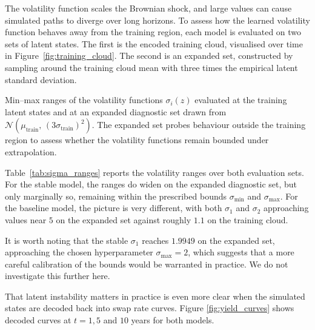 \begin{description}[
    style=unboxed,
    leftmargin=0pt,
    labelindent=0pt,
    labelsep=0.5em
]
\item[Volatility bounds.] The volatility function scales the Brownian shock, and large values can cause simulated paths to diverge over long horizons. To assess how the learned volatility function behaves away from the training region, each model is evaluated on two sets of latent states. The first is the encoded training cloud, visualised over time in Figure~\ref{fig:training_cloud}. The second is an expanded set, constructed by sampling around the training cloud mean with three times the empirical latent standard deviation.

\begin{table}[H]
\centering
\small


\caption{Min--max ranges of the volatility functions $\sigma_i(z)$ evaluated at the training latent states and at an expanded diagnostic set drawn from $\mathcal{N}(\mu_{\mathrm{train}},\, (3\sigma_{\mathrm{train}})^2)$. The expanded set probes behaviour outside the training region to assess whether the volatility functions remain bounded under extrapolation.}
\label{tab:sigma_ranges}
\end{table}

Table~\ref{tab:sigma_ranges} reports the volatility ranges over both evaluation sets. For the stable model, the ranges do widen on the expanded diagnostic set, but only marginally so, remaining within the prescribed bounds $\sigma_{\min}$ and $\sigma_{\max}$. For the baseline model, the picture is very different, with both $\sigma_1$ and $\sigma_2$ approaching values near $5$ on the expanded set against roughly $1.1$ on the training cloud. 

It is worth noting that the stable $\sigma_1$ reaches $1.9949$ on the expanded set, approaching the chosen hyperparameter $\sigma_{\max} = 2$, which suggests that a more careful calibration of the bounds would be warranted in practice. We do not investigate this further here.


\item[Decoded swap-rate curves.] That latent instability matters in practice is even more clear when the simulated states are decoded back into swap rate curves. Figure \ref{fig:yield_curves} shows decoded curves at $t=1,5$ and $10$ years for both models.


\end{description}
